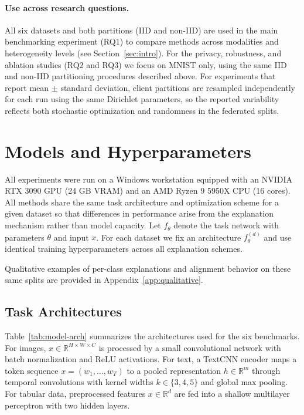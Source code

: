 \documentclass{article}
\theoremstyle{plain}
\theoremstyle{definition}
\theoremstyle{remark}
\begin{document}
\paragraph{Use across research questions.}
All six datasets and both partitions (IID and non-IID) are used in the main benchmarking experiment (RQ1) to compare methods across modalities and heterogeneity levels (see Section~\ref{sec:intro}). For the privacy, robustness, and ablation studies (RQ2 and RQ3) we focus on MNIST only, using the same IID and non-IID partitioning procedures described above. For experiments that report mean $\pm$ standard deviation, client partitions are resampled independently for each run using the same Dirichlet parameters, so the reported variability reflects both stochastic optimization and randomness in the federated splits.


\section{Models and Hyperparameters}
\label{app:models}

All experiments were run on a Windows workstation equipped with an NVIDIA RTX 3090 GPU (24 GB VRAM) and an AMD Ryzen 9 5950X CPU (16 cores). All methods share the same task architecture and optimization scheme for a given dataset so that differences in performance arise from the explanation mechanism rather than model capacity. Let $f_{\theta}$ denote the task network with parameters $\theta$ and input $x$. For each dataset we fix an architecture $f_{\theta}^{(d)}$ and use identical training hyperparameters across all explanation schemes.


Qualitative examples of per-class explanations and alignment behavior on these same splits are provided in Appendix~\ref{app:qualitative}.


\subsection{Task Architectures}

Table~\ref{tab:model-arch} summarizes the architectures used for the six benchmarks. For images, $x\in\mathbb{R}^{H\times W\times C}$ is processed by a small convolutional network with batch normalization and ReLU activations. For text, a TextCNN encoder maps a token sequence $x=(w_1,\dots,w_T)$ to a pooled representation $h\in\mathbb{R}^{m}$ through temporal convolutions with kernel widths $k\in\{3,4,5\}$ and global max pooling. For tabular data, preprocessed features $x\in\mathbb{R}^{d}$ are fed into a shallow multilayer perceptron with two hidden layers.
\end{document}

